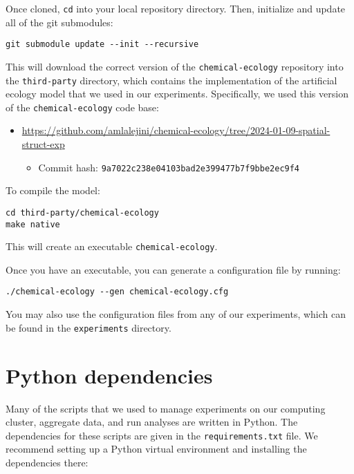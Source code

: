 \documentclass[
]{book}
\providecommand{\tightlist}{%
  \setlength{\itemsep}{0pt}\setlength{\parskip}{0pt}}
\begin{document}
Once cloned, \texttt{cd} into your local repository directory.
Then, initialize and update all of the git submodules:

\begin{verbatim}
git submodule update --init --recursive
\end{verbatim}

This will download the correct version of the \texttt{chemical-ecology} repository into the \texttt{third-party} directory, which contains the implementation of the artificial ecology model that we used in our experiments.
Specifically, we used this version of the \texttt{chemical-ecology} code base:

\begin{itemize}
\tightlist
\item
  \url{https://github.com/amlalejini/chemical-ecology/tree/2024-01-09-spatial-struct-exp}

  \begin{itemize}
  \tightlist
  \item
    Commit hash: \texttt{9a7022c238e04103bad2e399477b7f9bbe2ec9f4}
  \end{itemize}
\end{itemize}

To compile the model:

\begin{verbatim}
cd third-party/chemical-ecology
make native
\end{verbatim}

This will create an executable \texttt{chemical-ecology}.

Once you have an executable, you can generate a configuration file by running:

\begin{verbatim}
./chemical-ecology --gen chemical-ecology.cfg
\end{verbatim}

You may also use the configuration files from any of our experiments, which can be found in the \texttt{experiments} directory.

\hypertarget{python-dependencies}{%
\section{Python dependencies}\label{python-dependencies}}

Many of the scripts that we used to manage experiments on our computing cluster, aggregate data, and run analyses are written in Python.
The dependencies for these scripts are given in the \texttt{requirements.txt} file.
We recommend setting up a Python virtual environment and installing the dependencies there:
\end{document}
